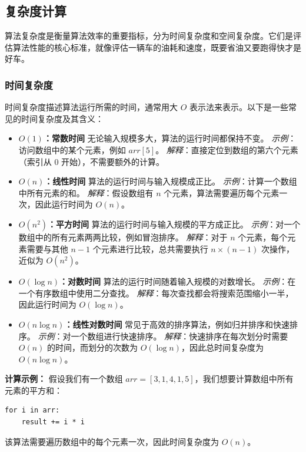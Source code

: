 \documentclass[lang=cn,newtx,10pt,scheme=chinese]{elegantbook}
\begin{document}
\subsection{复杂度计算}
算法复杂度是衡量算法效率的重要指标，分为时间复杂度和空间复杂度。它们是评估算法性能的核心标准，就像评估一辆车的油耗和速度，既要省油又要跑得快才是好车。

\subsubsection{时间复杂度}
时间复杂度描述算法运行所需的时间，通常用大 $O$ 表示法来表示。以下是一些常见的时间复杂度及其含义：

\begin{itemize}
    \item \textbf{$O(1)$：常数时间}
    无论输入规模多大，算法的运行时间都保持不变。
    \textit{示例}：访问数组中的某个元素，例如 $arr[5]$。
    \textit{解释}：直接定位到数组的第六个元素（索引从 0 开始），不需要额外的计算。

    \item \textbf{$O(n)$：线性时间}
    算法的运行时间与输入规模成正比。
    \textit{示例}：计算一个数组中所有元素的和。
    \textit{解释}：假设数组有 $n$ 个元素，算法需要遍历每个元素一次，因此运行时间为 $O(n)$。

    \item \textbf{$O(n^2)$：平方时间}
    算法的运行时间与输入规模的平方成正比。
    \textit{示例}：对一个数组中的所有元素两两比较，例如冒泡排序。
    \textit{解释}：对于 $n$ 个元素，每个元素需要与其他 $n-1$ 个元素进行比较，总共需要执行 $n \times (n-1)$ 次操作，近似为 $O(n^2)$。

    \item \textbf{$O(\log n)$：对数时间}
    算法的运行时间随着输入规模的对数增长。
    \textit{示例}：在一个有序数组中使用二分查找。
    \textit{解释}：每次查找都会将搜索范围缩小一半，因此运行时间为 $O(\log n)$。

    \item \textbf{$O(n \log n)$：线性对数时间}
    常见于高效的排序算法，例如归并排序和快速排序。
    \textit{示例}：对一个数组进行快速排序。
    \textit{解释}：快速排序在每次划分时需要 $O(n)$ 的时间，而划分的次数为 $O(\log n)$，因此总时间复杂度为 $O(n \log n)$。
\end{itemize}

\textbf{计算示例：}
假设我们有一个数组 $arr = [3, 1, 4, 1, 5]$，我们想要计算数组中所有元素的平方和：
\begin{verbatim}
for i in arr:
    result += i * i
\end{verbatim}
该算法需要遍历数组中的每个元素一次，因此时间复杂度为 $O(n)$。
\end{document}
